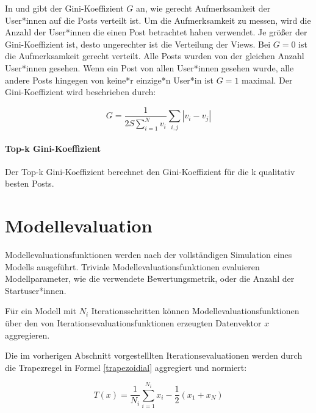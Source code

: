 In \cite{Lerman2014} und \cite{Salganik2006854} gibt der Gini-Koeffizient $G$ an, wie gerecht Aufmerksamkeit der User*innen auf die Posts verteilt ist.
Um die Aufmerksamkeit zu messen, wird die Anzahl der User*innen die einen Post betrachtet haben verwendet. Je größer der Gini-Koeffizient ist, desto ungerechter ist die Verteilung der Views. 
Bei $G = 0$ ist die Aufmerksamkeit gerecht verteilt. Alle Posts wurden von der gleichen Anzahl User*innen gesehen. Wenn ein Post von allen User*innen gesehen wurde, alle andere Posts hingegen von keine*r einzige*n User*in ist $G = 1$ maximal. Der Gini-Koeffizient wird beschrieben durch:

\begin{equation}
G = \frac{1}{2S\sum_{i = 1}^{N}v_{i}}\sum_{i,j}|v_{i} - v_{j} |
\end{equation}

\paragraph{Top-k Gini-Koeffizient}

Der Top-k Gini-Koeffizient berechnet den Gini-Koeffizient für die k qualitativ besten Posts.



\section{Modellevaluation}

Modellevaluationsfunktionen werden nach der vollständigen Simulation eines Modells ausgeführt. 
Triviale Modellevaluationsfunktionen evaluieren Modellparameter, wie die verwendete Bewertungsmetrik, oder die Anzahl der Startuser*innen. 


Für ein Modell mit $N_i$ Iterationsschritten können 
Modellevaluationsfunktionen über den von Iterationsevaluationsfunktionen erzeugten Datenvektor $x$ aggregieren. 

Die im vorherigen Abschnitt vorgestelllten Iterationsevaluationen werden durch die Trapezregel in Formel \ref{trapezoidial} aggregiert und normiert:

\begin{equation}
\label{trapezoidial}
T(x) = \frac{1}{N_i}\sum_{i = 1}^{N_i}x_i - \frac{1}{2}(x_1 + x_N)
\end{equation} 











